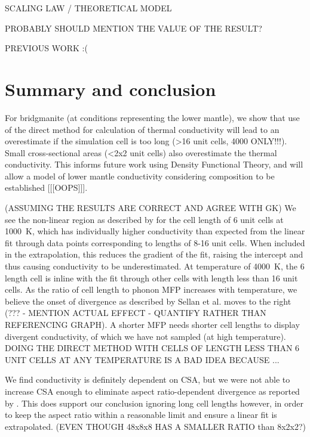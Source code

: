 \documentclass[%
preprint,                                  %
nofootinbib,
 amsmath,amssymb,
 aps,
]{revtex4-1}
\begin{document}
SCALING LAW / THEORETICAL MODEL

PROBABLY SHOULD MENTION THE VALUE OF THE RESULT?

PREVIOUS WORK :(







\section{\label{sec:summary}Summary and conclusion}

For bridgmanite (at conditions representing the lower mantle), we show that use of the direct method for calculation of thermal conductivity will lead to an overestimate if the simulation cell is too long (\textgreater 16 unit cells, 4000 ONLY!!!). Small cross-sectional areas (\textless 2x2 unit cells) also overestimate the thermal conductivity. This informs future work using Density Functional Theory, and will allow a model of lower mantle conductivity considering composition to be established [[[OOPS]]].

(ASSUMING THE RESULTS ARE CORRECT AND AGREE WITH GK) We see the non-linear region as described by \citet{Sellan2010} for the cell length of 6 unit cells at 1000~K, which has individually higher conductivity than expected from the linear fit through data points corresponding to lengths of 8-16 unit cells. When included in the extrapolation, this reduces the gradient of the fit, raising the intercept and thus causing conductivity to be underestimated. At temperature of 4000~K, the 6 length cell is inline with the fit through other cells with length less than 16 unit cells. As the ratio of cell length to phonon MFP increases with temperature, we believe the onset of divergence as described by Sellan et al. moves to the right (??? - MENTION ACTUAL EFFECT - QUANTIFY RATHER THAN REFERENCING GRAPH). A shorter MFP needs shorter cell lengths to display divergent conductivity, of which we have not sampled (at high temperature). DOING THE DIRECT METHOD WITH CELLS OF LENGTH LESS THAN 6 UNIT CELLS AT ANY TEMPERATURE IS A BAD IDEA BECAUSE ... 

We find conductivity is definitely dependent on CSA, but we were not able to increase CSA enough to eliminate aspect ratio-dependent divergence as reported by \citet{Hu2011}. This does support our conclusion ignoring long cell lengths however, in order to keep the aspect ratio within a reasonable limit and ensure a linear fit is extrapolated. (EVEN THOUGH 48x8x8 HAS A SMALLER RATIO than 8x2x2?)
\end{document}
